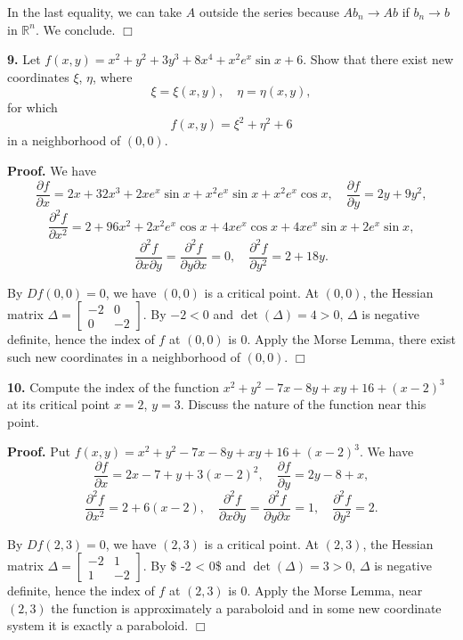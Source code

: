 \documentclass{article}
\begin{document}
In the last equality, we can take $A$ outside the series because
$Ab_n \to Ab$ if $b_n \to b$ in $\mathbb{R}^n$. We conclude. $\Box$

    \textbf{9.} Let
$f (x, y) = x^2 + y^2 + 3y^3 + 8x^4 + x^2 e^x \sin x + 6$. Show that
there exist new coordinates $\xi$, $\eta$, where
\[\xi = \xi(x, y),\quad \eta = \eta(x, y),\] for which
\[f (x, y) = \xi^2 + \eta^2 + 6\] in a neighborhood of $(0, 0)$.

    \textbf{Proof.} We have
\[\frac{\partial f}{\partial x} = 2x + 32x^3 + 2xe^x\sin x + x^2 e^x \sin x + x^2 e^x \cos x,\quad \frac{\partial f}{\partial y} = 2y + 9y^2,\]
\[\frac{\partial^2 f}{\partial x^2} = 2 + 96x^2 + 2x^2 e^x \cos x + 4x e^x \cos x + 4xe^x \sin x + 2e^x\sin x,\]
\[\frac{\partial^2 f}{\partial x\partial y} = \frac{\partial^2 f}{\partial y\partial x} = 0, \quad \frac{\partial^2 f}{\partial y^2}= 2 + 18y.\]

By $Df(0,0) = 0$, we have $(0,0)$ is a critical point. At $(0,0)$, the
Hessian matrix $\Delta = \begin{bmatrix}-2 & 0 \\ 0 & -2 \end{bmatrix}$.
By $-2 < 0$ and $\det (\Delta) = 4 > 0$, $\Delta$ is negative definite,
hence the index of $f$ at $(0,0)$ is $0$. Apply the Morse Lemma, there
exist such new coordinates in a neighborhood of $(0,0)$. $\Box$

    \textbf{10.} Compute the index of the function
$x^2 + y^2 − 7x − 8y + xy + 16 + (x − 2)^3$ at its critical point
$x = 2$, $y = 3$. Discuss the nature of the function near this point.

    \textbf{Proof.} Put
$f(x,y) = x^2 + y^2 − 7x − 8y + xy + 16 + (x − 2)^3$. We have
\[\frac{\partial f}{\partial x} = 2x - 7 + y + 3(x-2)^2,\quad \frac{\partial f}{\partial y} = 2y - 8 + x,\]
\[\frac{\partial^2 f}{\partial x^2} = 2 + 6(x-2),\quad \frac{\partial^2 f}{\partial x\partial y} =  \frac{\partial^2 f}{\partial y\partial x} = 1,\quad \frac{\partial^2 f}{\partial y^2} = 2.\]

By $Df(2,3) = 0$, we have $(2,3)$ is a critical point. At $(2,3)$, the
Hessian matrix $\Delta = \begin{bmatrix}-2 & 1 \\ 1 & -2 \end{bmatrix}$.
By \$ -2 \textless{} 0\$ and $\det (\Delta) = 3 > 0$, $\Delta$ is
negative definite, hence the index of $f$ at $(2,3)$ is $0$. Apply the
Morse Lemma, near $(2,3)$ the function is approximately a paraboloid and
in some new coordinate system it is exactly a paraboloid. $\Box$


    
    
    
    
\end{document}
